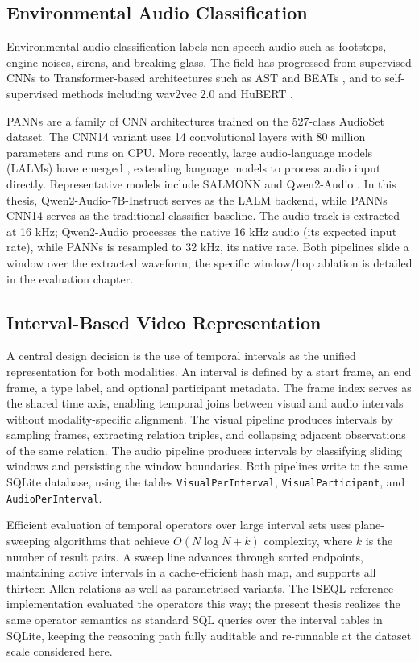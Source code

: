\subsection{Environmental Audio Classification}

Environmental audio classification labels non-speech audio such as footsteps, engine noises, sirens, and breaking glass. The field has progressed from supervised CNNs to Transformer-based architectures such as AST \citep{gong2021ast} and BEATs \citep{chen2023beats}, and to self-supervised methods including wav2vec 2.0 \citep{baevski2020wav2vec2} and HuBERT \citep{hsu2021hubert}.

PANNs \citep{kong2020panns} are a family of CNN architectures trained on the 527-class AudioSet \citep{gemmeke2017audioset} dataset. The CNN14 variant uses 14 convolutional layers with 80 million parameters and runs on CPU. More recently, large audio-language models (LALMs) have emerged \citep{luo2026lalmsurvey}, extending language models to process audio input directly. Representative models include SALMONN \citep{tang2024salmonn} and Qwen2-Audio \citep{chu2024qwen2audio}. In this thesis, Qwen2-Audio-7B-Instruct serves as the LALM backend, while PANNs CNN14 serves as the traditional classifier baseline. The audio track is extracted at 16 kHz; Qwen2-Audio processes the native 16 kHz audio (its expected input rate), while PANNs is resampled to 32 kHz, its native rate. Both pipelines slide a window over the extracted waveform; the specific window/hop ablation is detailed in the evaluation chapter.

\subsection{Interval-Based Video Representation}

A central design decision is the use of temporal intervals as the unified representation for both modalities. An interval is defined by a start frame, an end frame, a type label, and optional participant metadata. The frame index serves as the shared time axis, enabling temporal joins between visual and audio intervals without modality-specific alignment. The visual pipeline produces intervals by sampling frames, extracting relation triples, and collapsing adjacent observations of the same relation. The audio pipeline produces intervals by classifying sliding windows and persisting the window boundaries. Both pipelines write to the same SQLite database, using the tables \texttt{VisualPerInterval}, \texttt{VisualParticipant}, and \texttt{AudioPerInterval}.

Efficient evaluation of temporal operators over large interval sets uses plane-sweeping algorithms \citep{piatov2021cache} that achieve $O(N \log N + k)$ complexity, where $k$ is the number of result pairs. A sweep line advances through sorted endpoints, maintaining active intervals in a cache-efficient hash map, and supports all thirteen Allen relations as well as parametrised variants. The ISEQL reference implementation evaluated the operators this way; the present thesis realizes the same operator semantics as standard SQL queries over the interval tables in SQLite, keeping the reasoning path fully auditable and re-runnable at the dataset scale considered here.
